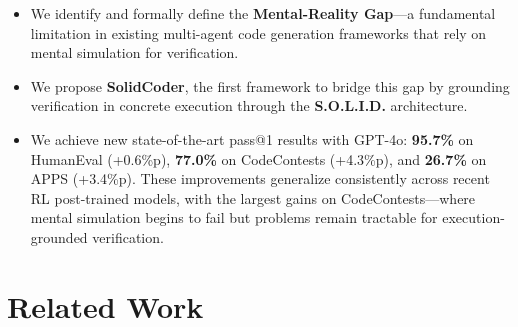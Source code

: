 \documentclass[11pt]{article}
\begin{document}
\begin{itemize}
    \item We identify and formally define the \textbf{Mental-Reality Gap}---a fundamental limitation in existing multi-agent code generation frameworks that rely on mental simulation for verification.
    \item We propose \textbf{SolidCoder}, the first framework to bridge this gap by grounding verification in concrete execution through the \textbf{S.O.L.I.D.} architecture.
    \item We achieve new state-of-the-art pass@1 results with GPT-4o: \textbf{95.7\%} on HumanEval (+0.6\%p), \textbf{77.0\%} on CodeContests (+4.3\%p), and \textbf{26.7\%} on APPS (+3.4\%p). These improvements generalize consistently across recent RL post-trained models, with the largest gains on CodeContests---where mental simulation begins to fail but problems remain tractable for execution-grounded verification.
\end{itemize}

\section{Related Work}
\end{document}
